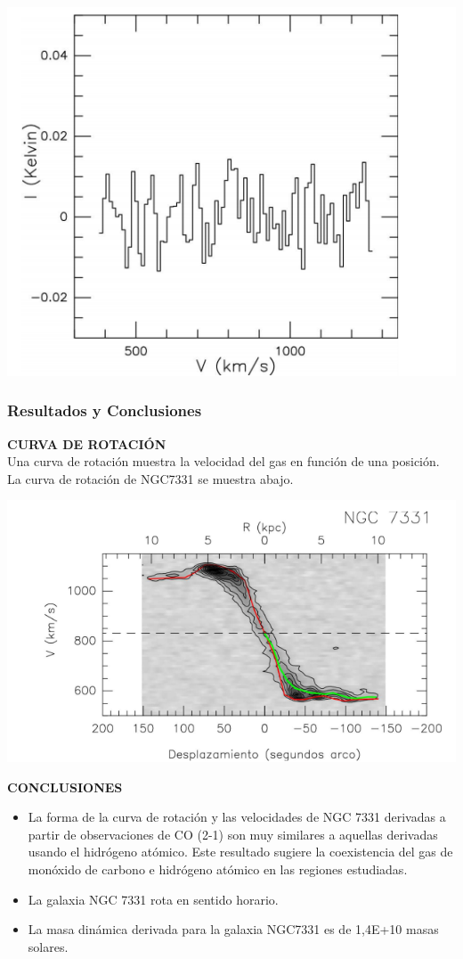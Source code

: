 \documentclass[8pt]{beamer}
\begin{document}
\begin{frame}
\begin{minipage}[t]{0.32\linewidth}
\end{minipage}
\begin{minipage}[t]{0.32\linewidth}
\includegraphics[width=0.9\linewidth]{figures/ngc3.png}
\end{minipage}	
\end{frame}
\begin{frame}
\frametitle{Resultados y Conclusiones}
\textbf{CURVA DE ROTACIÓN}\\
Una curva de rotación muestra la velocidad del gas en función de una posición. La curva de rotación de NGC7331 se muestra abajo.
\begin{center}
\includegraphics[width=0.450\linewidth]{figures/rotacion.png}
\end{center}
\textbf{CONCLUSIONES}\\
\begin{itemize}
\item La forma de la curva de rotación y las velocidades de NGC 7331 derivadas a partir de observaciones de CO (2-1) son muy similares a aquellas derivadas usando el hidrógeno atómico. Este resultado sugiere la coexistencia del gas de monóxido de carbono e hidrógeno atómico en las regiones estudiadas.
\item La galaxia NGC 7331  rota en sentido horario. 
\item La masa dinámica derivada para la galaxia NGC7331 es de 1,4E+10 masas solares. 
\end{itemize}
\end{frame}
\end{document}
